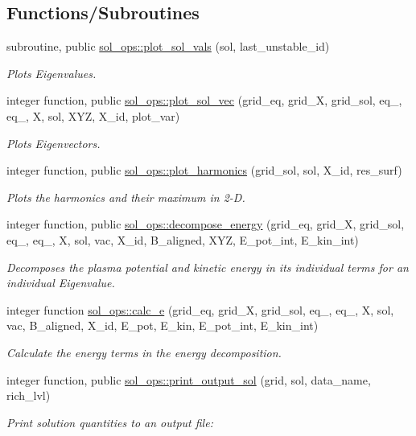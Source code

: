 \subsection*{Functions/\+Subroutines}
\begin{DoxyCompactItemize}
\item 
subroutine, public \hyperlink{namespacesol__ops_a17863486476a62558988ce45101fd3b3}{sol\+\_\+ops\+::plot\+\_\+sol\+\_\+vals} (sol, last\+\_\+unstable\+\_\+id)
\begin{DoxyCompactList}\small\item\em Plots Eigenvalues. \end{DoxyCompactList}\item 
integer function, public \hyperlink{namespacesol__ops_ae14af60a6f8f77e7dde1e93dbaa7e6d0}{sol\+\_\+ops\+::plot\+\_\+sol\+\_\+vec} (grid\+\_\+eq, grid\+\_\+X, grid\+\_\+sol, eq\+\_, eq\+\_, X, sol, X\+YZ, X\+\_\+id, plot\+\_\+var)
\begin{DoxyCompactList}\small\item\em Plots Eigenvectors. \end{DoxyCompactList}\item 
integer function, public \hyperlink{namespacesol__ops_ab9a1e138cb94b547f4fd7669c677ed5c}{sol\+\_\+ops\+::plot\+\_\+harmonics} (grid\+\_\+sol, sol, X\+\_\+id, res\+\_\+surf)
\begin{DoxyCompactList}\small\item\em Plots the harmonics and their maximum in 2-\/D. \end{DoxyCompactList}\item 
integer function, public \hyperlink{namespacesol__ops_a263d4562653c449e3822abcb4cfe69ba}{sol\+\_\+ops\+::decompose\+\_\+energy} (grid\+\_\+eq, grid\+\_\+X, grid\+\_\+sol, eq\+\_, eq\+\_, X, sol, vac, X\+\_\+id, B\+\_\+aligned, X\+YZ, E\+\_\+pot\+\_\+int, E\+\_\+kin\+\_\+int)
\begin{DoxyCompactList}\small\item\em Decomposes the plasma potential and kinetic energy in its individual terms for an individual Eigenvalue. \end{DoxyCompactList}\item 
integer function \hyperlink{namespacesol__ops_a3f89cc3db07dd11e5a3d631cb84bb4c8}{sol\+\_\+ops\+::calc\+\_\+e} (grid\+\_\+eq, grid\+\_\+X, grid\+\_\+sol, eq\+\_, eq\+\_, X, sol, vac, B\+\_\+aligned, X\+\_\+id, E\+\_\+pot, E\+\_\+kin, E\+\_\+pot\+\_\+int, E\+\_\+kin\+\_\+int)
\begin{DoxyCompactList}\small\item\em Calculate the energy terms in the energy decomposition. \end{DoxyCompactList}\item 
integer function, public \hyperlink{namespacesol__ops_ad85edd793afcfb100fe8d08b6f5aab75}{sol\+\_\+ops\+::print\+\_\+output\+\_\+sol} (grid, sol, data\+\_\+name, rich\+\_\+lvl)
\begin{DoxyCompactList}\small\item\em Print solution quantities to an output file\+: \end{DoxyCompactList}\end{DoxyCompactItemize}
